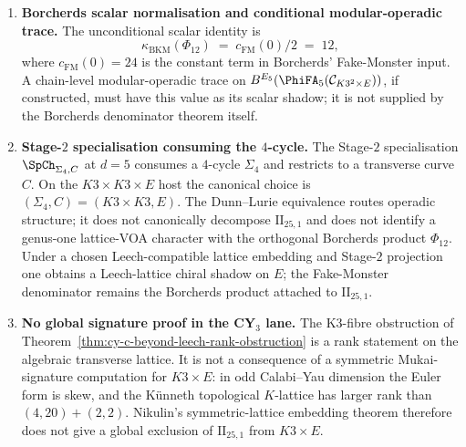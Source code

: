 \begin{theorem}[Fake Monster placement at \texorpdfstring{$d = 5$}{d = 5}: Dunn--Lurie factorisation, Niemeier selection, modular-operadic supertrace]
\begin{enumerate}[label=\textup{(\roman*)}]
lattices of Niemeier 1968 (\emph{J.\ Number Theory} classification;
Venkov $1980$ Trudy Mat.\ Inst.\ Steklov~$148$ for the Eisenstein-mass
proof), the Leech lattice $\Leech = \Lambda_{24}$ is the unique
rootless Niemeier (Conway 1969 \emph{Invent.\ Math.} 7 Theorem~$4.1$).
The Borcherds 1990 Fake-Monster construction (\emph{Adv.\ Math.}~$83$
Theorem~$10.1$) takes as input the Lorentzian lattice
$\mathrm{II}_{25,1} = \mathrm{II}_{1,1} \oplus \Leech(-1)$
because the Leech cusp has rootless finite quotient
\(\rho^\perp/\mathbb Z\rho\simeq\Leech\). This rootlessness does not
remove the Lorentzian real simple roots; it selects the cusp at which
the real roots are the norm-$2$ Leech-cusp roots and the null imaginary
simples have multiplicity \(24\). The twenty-three non-Leech
Niemeier lattices $N_1, \ldots, N_{23}$ produce, under the same
Borcherds-lift functor, the Scheithauer $2004$ family of twenty-three
sibling BKM algebras $\mathfrak g^{\mathrm{Sch}}_{N_j}$
(Scheithauer $2004$ arXiv:math/$0403443$ Theorem~$4.1$; Scheithauer
$2006$ arXiv:math/$0605314$ Theorem~$1.1$; Scheithauer $2008$
\emph{Mem.\ AMS}~$194$ \S$3$).
\item \textbf{Borcherds scalar normalisation and conditional
modular-operadic trace.} The unconditional scalar identity is
\[
 \kappa_{\mathrm{BKM}}(\Phi_{12})
 \;=\;
 c_{\mathrm{FM}}(0)/2
 \;=\;
 12,
\]
where $c_{\mathrm{FM}}(0)=24$ is the constant term in Borcherds'
Fake-Monster input. A chain-level modular-operadic trace on
$B^{E_5}(\PhiFA_5(\mathcal C_{K3^2\times E}))$, if constructed, must
have this value as its scalar shadow; it is not supplied by the
Borcherds denominator theorem itself.
\item \textbf{Stage-$2$ specialisation consuming the $4$-cycle.} The
Stage-$2$ specialisation $\SpCh_{\Sigma_4, C}$ at $d = 5$ consumes a
$4$-cycle $\Sigma_4$ and restricts to a transverse curve $C$. On the
$K3 \times K3 \times E$ host the canonical choice is
$(\Sigma_4, C) = (K3 \times K3, E)$. The Dunn--Lurie equivalence
routes operadic structure; it does not canonically decompose
$\mathrm{II}_{25,1}$ and does not identify a genus-one lattice-VOA
character with the orthogonal Borcherds product $\Phi_{12}$. Under a
chosen Leech-compatible lattice embedding and Stage-$2$ projection one
obtains a Leech-lattice chiral shadow on $E$; the Fake-Monster
denominator remains the Borcherds product attached to
$\mathrm{II}_{25,1}$.
\item \textbf{No global signature proof in the CY$_3$ lane.} The
K3-fibre obstruction of
Theorem~\ref{thm:cy-c-beyond-leech-rank-obstruction} is a rank
statement on the algebraic transverse lattice. It is not a consequence
of a symmetric Mukai-signature computation for $K3\times E$: in odd
Calabi--Yau dimension the Euler form is skew, and the K\"unneth
topological $K$-lattice has larger rank than $(4,20)+(2,2)$. Nikulin's
symmetric-lattice embedding theorem therefore does not give a global
exclusion of $\mathrm{II}_{25,1}$ from $K3\times E$.
\end{enumerate}
\end{theorem}

